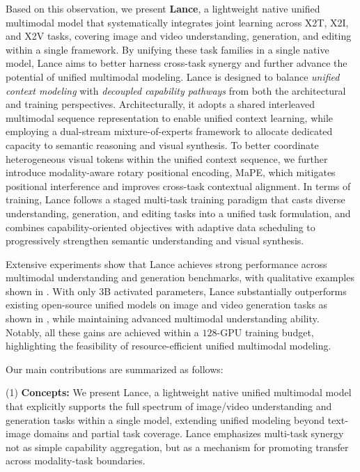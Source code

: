 Based on this observation, we present \textbf{Lance}, a lightweight native unified multimodal model that systematically integrates joint learning across X2T, X2I, and X2V tasks, covering image and video understanding, generation, and editing within a single framework. 
By unifying these task families in a single native model, Lance aims to better harness cross-task synergy and further advance the potential of unified multimodal modeling.
Lance is designed to balance \textit{unified context modeling} with \textit{decoupled capability pathways} from both the architectural and training perspectives. 
Architecturally, it adopts a shared interleaved multimodal sequence representation to enable unified context learning, while employing a dual-stream mixture-of-experts framework to allocate dedicated capacity to semantic reasoning and visual synthesis.
 To better coordinate heterogeneous visual tokens within the unified context sequence, we further introduce modality-aware rotary positional encoding, MaPE, which mitigates positional interference and improves cross-task contextual alignment.
In terms of training, Lance follows a staged multi-task training paradigm that casts diverse understanding, generation, and editing tasks into a unified task formulation, and combines capability-oriented objectives with adaptive data scheduling to progressively strengthen semantic understanding and visual synthesis.

Extensive experiments show that Lance achieves strong performance across multimodal understanding and generation benchmarks, with qualitative examples shown in . With only $3$B activated parameters, Lance substantially outperforms existing open-source unified models on image and video generation tasks as shown in , while maintaining advanced multimodal understanding ability. Notably, all these gains are achieved within a $128$-GPU training budget, highlighting the feasibility of resource-efficient unified multimodal modeling.






Our main contributions are summarized as follows:

(1) \textbf{Concepts:} We present Lance, a lightweight native unified multimodal model that explicitly supports the full spectrum of image/video understanding and generation tasks within a single model, extending unified modeling beyond text-image domains and partial task coverage. Lance emphasizes multi-task synergy not as simple capability aggregation, but as a mechanism for promoting transfer across modality-task boundaries.

